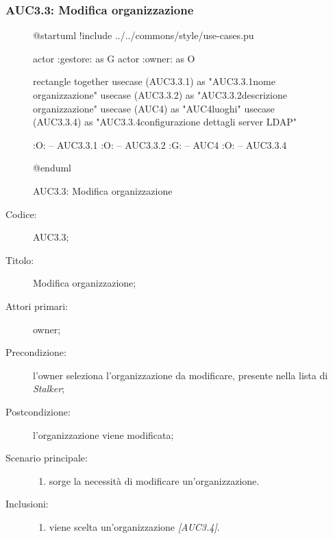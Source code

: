 \documentclass[../../../analisi-dei-requisiti.tex]{subfiles}
\begin{document}
\subsubsection{AUC3.3: Modifica organizzazione}%
\label{subs:AUC3.3}

\begin{figure}[H]
  \centering
  \begin{plantuml}
    @startuml
    !include ../../commons/style/use-cases.pu

    actor :gestore: as G
    actor :owner: as O

    rectangle {
        together {
            usecase (AUC3.3.1) as "AUC3.3.1\nModifica nome organizzazione"
            usecase (AUC3.3.2) as "AUC3.3.2\nModifica descrizione organizzazione"
            usecase (AUC4) as "AUC4\nGestione luoghi"
            usecase (AUC3.3.4) as "AUC3.3.4\nModifica configurazione dettagli server LDAP"
          }
      }

    :O: -- AUC3.3.1
    :O: -- AUC3.3.2
    :G: -- AUC4
    :O: -- AUC3.3.4

    @enduml
  \end{plantuml}
  \caption{AUC3.3: Modifica organizzazione}%
  \label{fig:AUC3_3}
\end{figure}

\begin{description}
  \item[Codice:] AUC3.3;
  \item[Titolo:] Modifica organizzazione;
  \item[Attori primari:] owner;
  \item[Precondizione:] l'owner seleziona l'organizzazione da modificare, presente nella lista di \emph{Stalker};
  \item[Postcondizione:] l'organizzazione viene modificata;
  \item[Scenario principale:]
        \begin{enumerate}
          \item sorge la necessità di modificare un'organizzazione.
        \end{enumerate}
  \item[Inclusioni:]
        \begin{enumerate}
          \item viene scelta un'organizzazione \emph{[AUC3.4]}.
        \end{enumerate}
\end{description}
\end{document}
